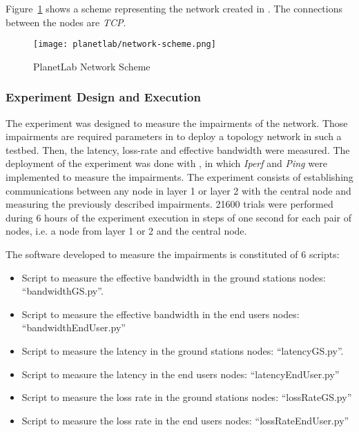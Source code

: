 %   


Figure~\ref{fig:ple-network-scheme} shows a scheme representing the network created in \pl. The
connections between the nodes are \emph{TCP}.

\begin{figure}[!h]
\begin{center}
\texttt{[image: planetlab/network-scheme.png]}

\caption{PlanetLab Network Scheme}
\label{fig:ple-network-scheme}
\end{center}
\end{figure}

\subsubsection{Experiment Design and Execution}

The experiment was designed to measure the impairments of the network. Those
impairments are required parameters in \vw to deploy a topology network in such
a testbed. Then, the latency, loss-rate and effective bandwidth were
measured. The deployment of the experiment was done with \nepi, in which
\emph{Iperf} and \emph{Ping} were implemented to measure the impairments. The
experiment consists of establishing communications between any node in layer 1
or layer 2 with the central node and measuring the previously described
impairments. 21600 trials were performed during 6 hours of the experiment execution in steps of one second for each pair of nodes, i.e. a node from layer 1 or 2 and the central node.

The software developed to measure the impairments is constituted of 6 scripts:
\begin{itemize}
\item Script to measure the effective bandwidth in the ground stations nodes: “bandwidthGS.py”.
\item Script to measure the effective bandwidth in the end users nodes: “bandwidthEndUser.py”
\item Script to measure the latency in the ground stations nodes: “latencyGS.py”.
\item Script to measure the latency  in the end users nodes: “latencyEndUser.py”
\item Script to measure the loss rate in the ground stations nodes: “lossRateGS.py”
\item Script to measure the loss rate in the end users nodes:
  “lossRateEndUser.py”

\end{itemize}

